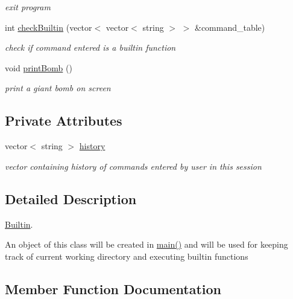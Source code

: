 \begin{DoxyCompactItemize}
\begin{DoxyCompactList}\small\item\em exit program \end{DoxyCompactList}\item 
int \hyperlink{classBuiltin_aa4e9f7f085e04a12fd47f4f1acfe8e4a}{check\+Builtin} (vector$<$ vector$<$ string $>$ $>$ \&command\+\_\+table)
\begin{DoxyCompactList}\small\item\em check if command entered is a builtin function \end{DoxyCompactList}\item 
void \hyperlink{classBuiltin_a24eec3cbc9da4b8886dd8cec8569c417}{print\+Bomb} ()
\begin{DoxyCompactList}\small\item\em print a giant bomb on screen \end{DoxyCompactList}\end{DoxyCompactItemize}
\subsection*{Private Attributes}
\begin{DoxyCompactItemize}
\item 
vector$<$ string $>$ \hyperlink{classBuiltin_a2ab51516980cbfa5c9b6fafd61c8800e}{history}\hypertarget{classBuiltin_a2ab51516980cbfa5c9b6fafd61c8800e}{}\label{classBuiltin_a2ab51516980cbfa5c9b6fafd61c8800e}

\begin{DoxyCompactList}\small\item\em vector containing history of commands entered by user in this session \end{DoxyCompactList}\end{DoxyCompactItemize}


\subsection{Detailed Description}
\hyperlink{classBuiltin}{Builtin}. 

An object of this class will be created in \hyperlink{main_8cpp_abf9e6b7e6f15df4b525a2e7705ba3089}{main()} and will be used for keeping track of current working directory and executing builtin functions 

\subsection{Member Function Documentation}
